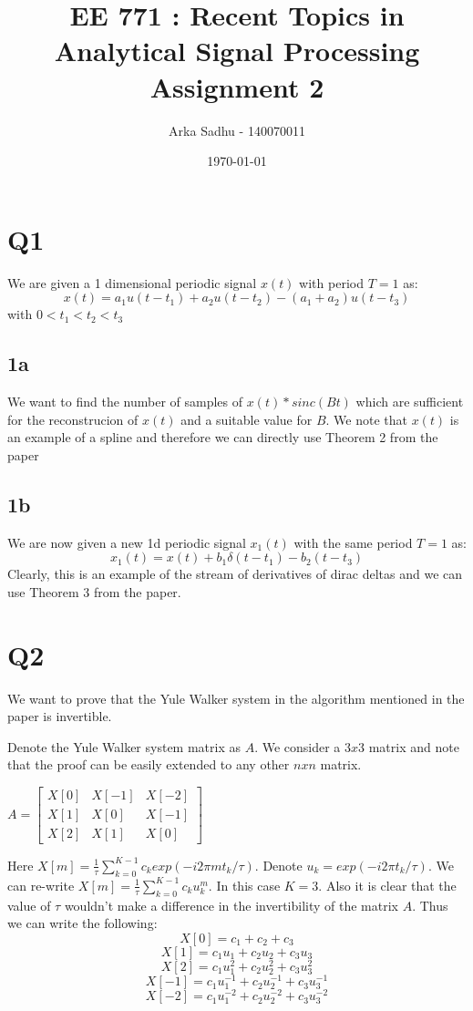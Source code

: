 \documentclass{article}
\title{EE 771 : Recent Topics in Analytical Signal Processing Assignment 2}
\author{Arka Sadhu - 140070011}
\date{\today}
\begin{document}
\maketitle

\section*{Q1}
We are given a 1 dimensional periodic signal $x(t)$ with period $T=1$ as:
$$x(t) = a_1 u(t - t_1) + a_2 u(t - t_2) - (a_1 + a_2) u(t - t_3)$$
with $0 < t_1 < t_2 < t_3$
\subsection*{1a}
We want to find the number of samples of $x(t) * sinc(Bt)$ which are sufficient for the reconstrucion of $x(t)$ and a suitable value for $B$. We note that $x(t)$ is an example of a spline and therefore we can directly use Theorem 2 from the paper

\subsection*{1b}
We are now given a new 1d periodic signal $x_1(t)$ with the same period $T=1$ as:
$$x_1(t) = x(t) + b_1 \delta (t - t_1) - b_2 (t - t_3)$$
Clearly, this is an example of the stream of derivatives of dirac deltas and we can use Theorem 3 from the paper.

\section*{Q2}
We want to prove that the Yule Walker system in the algorithm mentioned in the paper is invertible.

Denote the Yule Walker system matrix as $A$. We consider a $3x3$ matrix and note that the proof can be easily extended to any other $nxn$ matrix.

$A = \begin{bmatrix}
X[0] & X[-1] & X[-2]\\
X[1] & X[0] & X[-1]\\
X[2] & X[1] & X[0]
\end{bmatrix}$

Here $X[m] = \frac{1}{\tau} \sum_{k=0}^{K-1} c_k exp(-i 2 \pi m t_k / \tau)$. Denote $u_k = exp(-i 2\pi t_k / \tau)$. We can re-write $X[m] = \frac{1}{\tau} \sum_{k=0}^{K-1}c_k u_k^m$. In this case $K=3$. Also it is clear that the value of $\tau$ wouldn't make a difference in the invertibility of the matrix $A$. Thus we can write the following:
$$X[0] = c_1 + c_2 + c_3$$
$$X[1] = c_1u_1 + c_2 u_2 + c_3 u_3$$
$$X[2] = c_1 u_1^2 + c_2 u_2^2 + c_3u_3^2$$
$$X[-1] = c_1 u_1^{-1} + c_2 u_2^{-1} + c_3 u_3^{-1}$$
$$X[-2] = c_1 u_1^{-2} + c_2 u_2^{-2} + c_3 u_3^{-2}$$
\end{document}
